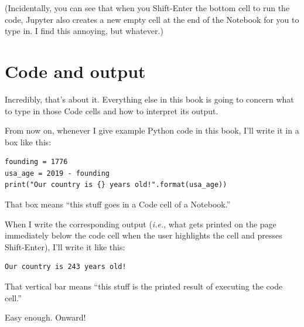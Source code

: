 (Incidentally, you can see that when you Shift-Enter the bottom cell to run the
code, Jupyter also creates a new empty cell at the end of the Notebook for you
to type in. I find this annoying, but whatever.)

\section{Code and output}

Incredibly, that's about it. Everything else in this book is going to concern
what to type in those Code cells and how to interpret its output.

From now on, whenever I give example Python code in this book, I'll write it in
a box like this:

\begin{Verbatim}[fontsize=\small,samepage=true,frame=single,framesep=3mm]
founding = 1776
usa_age = 2019 - founding
print("Our country is {} years old!".format(usa_age))
\end{Verbatim}

That box means ``this stuff goes in a Code cell of a Notebook.''

When I write the corresponding output (\textit{i.e.}, what gets printed on the
page immediately below the code cell when the user highlights the cell and
presses Shift-Enter), I'll write it like this:

\begin{Verbatim}[fontsize=\small,samepage=true,frame=leftline,framesep=5mm,framerule=1mm]
Our country is 243 years old!
\end{Verbatim}

That vertical bar means ``this stuff is the printed result of executing the
code cell.''

Easy enough. Onward!
